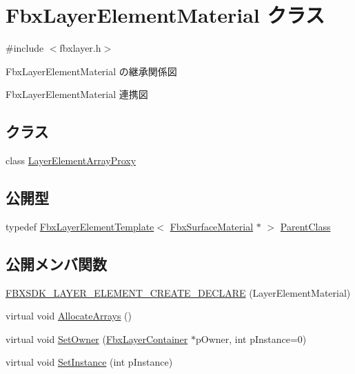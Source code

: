 \hypertarget{class_fbx_layer_element_material}{}\section{Fbx\+Layer\+Element\+Material クラス}
\label{class_fbx_layer_element_material}


{\ttfamily \#include $<$fbxlayer.\+h$>$}



Fbx\+Layer\+Element\+Material の継承関係図


Fbx\+Layer\+Element\+Material 連携図
\subsection*{クラス}
\begin{DoxyCompactItemize}
\item 
class \hyperlink{class_fbx_layer_element_material_1_1_layer_element_array_proxy}{Layer\+Element\+Array\+Proxy}
\end{DoxyCompactItemize}
\subsection*{公開型}
\begin{DoxyCompactItemize}
\item 
typedef \hyperlink{class_fbx_layer_element_template}{Fbx\+Layer\+Element\+Template}$<$ \hyperlink{class_fbx_surface_material}{Fbx\+Surface\+Material} $\ast$ $>$ \hyperlink{class_fbx_layer_element_material_a8f8718ab06cb0f6a9aa82205573fa64b}{Parent\+Class}
\end{DoxyCompactItemize}
\subsection*{公開メンバ関数}
\begin{DoxyCompactItemize}
\item 
\hyperlink{class_fbx_layer_element_material_a28e7e3a7c499ecf9beb67ab1111e1e29}{F\+B\+X\+S\+D\+K\+\_\+\+L\+A\+Y\+E\+R\+\_\+\+E\+L\+E\+M\+E\+N\+T\+\_\+\+C\+R\+E\+A\+T\+E\+\_\+\+D\+E\+C\+L\+A\+RE} (Layer\+Element\+Material)
\item 
virtual void \hyperlink{class_fbx_layer_element_material_a5bf99bae72fa4a516eed88e04a66b7ff}{Allocate\+Arrays} ()
\item 
virtual void \hyperlink{class_fbx_layer_element_material_afe025ea61981c53c05cb97bcd9174631}{Set\+Owner} (\hyperlink{class_fbx_layer_container}{Fbx\+Layer\+Container} $\ast$p\+Owner, int p\+Instance=0)
\item 
virtual void \hyperlink{class_fbx_layer_element_material_a45d70417f95d962c5e41bed5480888dc}{Set\+Instance} (int p\+Instance)
\end{DoxyCompactItemize}
